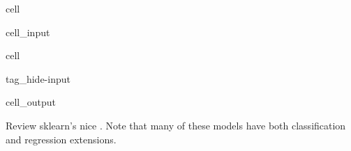 \documentclass[letterpaper,10pt,english]{jupyterBook}
\begin{document}
\begin{sphinxuseclass}{cell}\begin{sphinxVerbatimInput}

\begin{sphinxuseclass}{cell_input}
\begin{sphinxVerbatim}[commandchars=\\\{\}]
   
   

        
\end{sphinxVerbatim}

\end{sphinxuseclass}\end{sphinxVerbatimInput}

\end{sphinxuseclass}
\begin{sphinxuseclass}{cell}
\begin{sphinxuseclass}{tag_hide-input}\begin{sphinxVerbatimOutput}

\begin{sphinxuseclass}{cell_output}
\end{sphinxuseclass}\end{sphinxVerbatimOutput}

\end{sphinxuseclass}
\end{sphinxuseclass}
\sphinxAtStartPar
Review sklearn’s nice . Note that many of these models have both classification and regression extensions.
\end{document}
